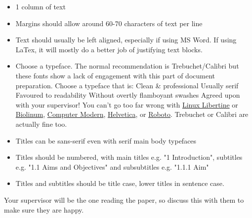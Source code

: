 \begin{itemize}
    \item 1 column of text
    \item Margins should allow around 60-70 characters of text per line
    \item Text should usually be left aligned, especially if using MS Word. If using LaTex, it will mostly do a better job of justifying text blocks.
    \item Choose a typeface. The normal recommendation is Trebuchet/Calibri but these fonts show a lack of engagement with this part of document preparation. Choose a typeface that is:
    \subitem Clean \& professional
    \subitem Usually serif
    \subitem Favoured to readability
    \subitem Without overtly flamboyant swashes
    \subitem Agreed upon with your supervisor!
    \subitem You can't go too far wrong with \hyperref[https://github.com/alerque/libertinus]{Linux Libertine} or \hyperref[https://tug.org/FontCatalogue/biolinum/]{Biolinum}, \hyperref[https://tug.org/FontCatalogue/computermodern/]{Computer Modern}, \hyperref[https://freefontsfamily.com/helvetica-font-family/]{Helvetica}, or \hyperref[https://fonts.google.com/specimen/Roboto]{Roboto}. Trebuchet or Calibri are actually fine too.
    \item Titles can be sans-serif even with serif main body typefaces
    \item Titles should be numbered, with main titles e.g. "1 Introduction", subtitles e.g. "1.1 Aims and Objectives" and subsubtitles e.g. "1.1.1 Aim"
    \item Titles and subtitles should be title case, lower titles in sentence case. 

\end{itemize}

Your supervisor will be the one reading the paper, so discuss this with them to make sure they are happy.

